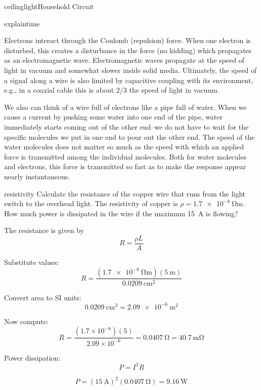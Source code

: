 \begin{mainquestion}{ceilinglight}{Household Circuit}
\begin{partquestion}{explaintime}
\begin{answer}
Electrons interact through the Coulomb (repulsion) force. When one electron is disturbed, this creates a disturbance in the force (no kidding) which propagates as an electromagnetic wave. Electromagnetic waves propagate at the speed of light in vacuum and somewhat slower inside solid media. Ultimately, the speed of a signal along a wire is also limited by capacitive coupling with its environment, e.g., in a coaxial cable this is about 2/3 the speed of light in vacuum.

We also can think of a wire full of electrons like a pipe full of water. When we cause a current by pushing some water into one end of the pipe, water immediately starts coming out of the other end–we do not have to wait for the specific molecules we put in one end to pour out the other end. The speed of the water molecules does not matter so much as the speed with which an applied force is transmitted among the individual molecules. Both for water molecules and electrons, this force is transmitted so fast as to make the response appear nearly instantaneous.
\end{answer}
\end{partquestion}

\begin{partquestion}{resistivity}
{Calculate the resistance of the copper wire that runs from the light switch to the overhead light. The resistivity of copper is $\rho = \qty{1.7e-8}{\ohm\meter}$. How much power is dissipated in the wire if the maximum \qty{15}{\ampere} is flowing?}

\begin{answer}
The resistance is given by
\[
R = \frac{\rho L}{A}
\]

Substitute values:
\[
R = \frac{(\qty{1.7e-8}{\ohm\meter})(\qty{5}{\meter})}{\qty{0.0209}{\centi\meter\squared}}
\]

Convert area to SI units:
\[
\qty{0.0209}{\centi\meter\squared} = \qty{2.09e-6}{\meter\squared}
\]

Now compute:
\[
R = \frac{(1.7 \times 10^{-8})(5)}{2.09 \times 10^{-6}}
  = \qty{0.0407}{\ohm}
  = \qty{40.7}{\milli\ohm}
\]

Power dissipation:
\[
P = I^2 R
\]

\[
P = (\qty{15}{\ampere})^2 (\qty{0.0407}{\ohm})
  = \qty{9.16}{\watt}
\]

\end{answer}
\end{partquestion}


\end{mainquestion}
